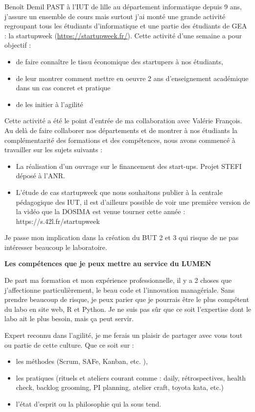 \documentclass{lettre}
\begin{document}
\begin{letter}{ Benoît Demil }
    PAST à l'IUT de lille au département informatique depuis 9 ans, j'assure un ensemble de cours mais surtout j'ai monté une grande activité regroupant tous les étudiants d'informatique et une partie des étudiants de GEA : la startupweek (\url{https://startupweek.fr/}). Cette activité d'une semaine a pour objectif :
    \begin{itemize}
        \item de faire connaître le tissu économique des startupers à nos étudiants, 
        \item de leur montrer comment mettre en oeuvre 2 ans d'enseignement académique dans un cas concret et pratique 
        \item de les initier à l'agilité
    \end{itemize}

    Cette activité a été le point d'entrée de ma collaboration avec Valérie François. Au delà de faire collaborer nos départements et de montrer à nos étudiants la complémentarité des formations et des compétences, nous avons commencé à travailler sur les sujets suivants :
    \begin{itemize}
        \item La réalisation d'un ouvrage sur le financement des start-ups. Projet STEFI déposé à l'ANR.
        \item L'étude de cas startupweek que nous souhaitons publier à la centrale pédagogique des IUT, il est d'ailleurs possible de voir une première version de la vidéo que la DOSIMA est venue tourner cette année : https://s.42l.fr/startupweek
    \end{itemize}

    Je passe mon implication dans la création du BUT 2 et 3 qui risque de ne pas intéresser beaucoup le laboratoire.

    \textbf{Les compétences que je peux mettre au service du LUMEN}

    De part ma formation et mon expérience professionnelle, il y a 2 choses que j'affectionne particulièrement, le beau code et l'innovation managériale.
    Sans prendre beaucoup de risque, je peux parier que je pourrais être le plus compétent du labo en site web, R et Python. Je ne suis pas sûr que ce soit l'expertise dont le labo ait le plus besoin, mais ça peut servir.

    Expert reconnu dans l'agilité, je me ferais un plaisir de partager avec vous tout ou partie de cette culture. Que ce soit sur :
    \begin{itemize}
        \item les méthodes (Scrum, SAFe, Kanban, etc. ), 
        \item les pratiques (rituels et ateliers courant comme : daily, rétrospectives, health check, backlog grooming, PI planning, atelier craft, toyota kata, etc.) 
        \item l'état d'esprit ou la philosophie qui la sous tend.
    \end{itemize}


\end{letter}
\end{document}
